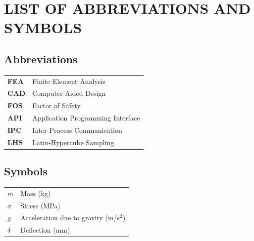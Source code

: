 \documentclass[12pt, a4paper]{report}
\begin{document}
\tableofcontents
\listoffigures
\listoftables

\clearpage

\section*{LIST OF ABBREVIATIONS AND SYMBOLS}

\subsection*{Abbreviations}
\begin{tabular}{ll}
\textbf{FEA} & Finite Element Analysis \\
\textbf{CAD} & Computer-Aided Design \\
\textbf{FOS} & Factor of Safety \\
\textbf{API} & Application Programming Interface \\
\textbf{IPC} & Inter-Process Communication \\
\textbf{LHS} & Latin-Hypercube Sampling \\
\end{tabular}

\vspace{1cm}

\subsection*{Symbols}
\begin{tabular}{ll}
$m$ & Mass (kg) \\
$\sigma$ & Stress (MPa) \\
$g$ & Acceleration due to gravity (m/s$^2$) \\
$\delta$ & Deflection (mm) \\
\end{tabular}

\newpage

\clearpage










\end{document}
